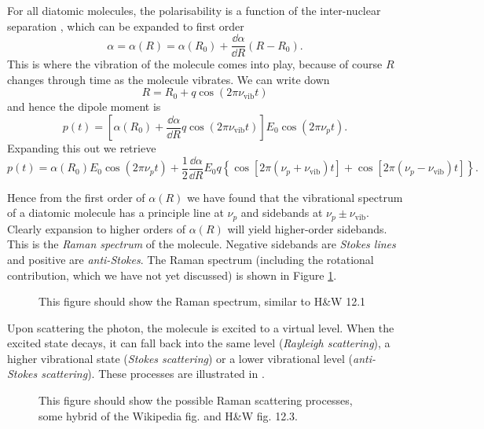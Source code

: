 For all diatomic molecules, the polarisability is a function of the
inter-nuclear separation \cite{}, which can be expanded to first order
%
\begin{equation}
\alpha = \alpha(R) = \alpha(R_0) + \frac{\dd \alpha}{\dd R}(R - R_0).
\end{equation}
%
This is where the vibration of the molecule comes into play, because of course
$R$ changes through time as the molecule vibrates. We can write down
%
\begin{equation}
R = R_0 + q \cos (2\pi \nu_\text{vib} t)
\end{equation}
and hence the dipole moment is
\begin{equation}
p(t) = \left[ \alpha(R_0) + \frac{\dd \alpha}{\dd R} q\cos (2\pi\nu_\text{vib}t)
\right] E_0 \cos(2\pi\nu_p t).
\end{equation}
Expanding this out we retrieve
\begin{equation}
p(t) = \alpha(R_0)E_0\cos(2\pi\nu_p t) + \frac{1}{2}\frac{\dd \alpha}{\dd R}
E_0 q \left\{ \cos\left[ 2\pi(\nu_p + \nu_\text{vib})t\right]
+ \cos\left[ 2\pi(\nu_p - \nu_\text{vib})t\right] \right\}.
\end{equation}

Hence from the first order of $\alpha(R)$ we have found that the vibrational
spectrum of a diatomic molecule has a principle line at $\nu_p$ and sidebands at
$\nu_p \pm \nu_\text{vib}$. Clearly expansion to higher orders of $\alpha(R)$
will yield higher-order sidebands. This is the \emph{Raman spectrum} of the
molecule. Negative sidebands are \emph{Stokes lines} and positive are
\emph{anti-Stokes}.
%
The Raman spectrum (including the rotational contribution, which we have not yet
discussed) is shown in Figure \ref{diaspec:fig:totalraman}.

\begin{figure}
  \caption{This figure should show the Raman spectrum, similar to H\&W 12.1}
  \label{diaspec:fig:totalraman}
\end{figure}

Upon scattering the photon, the molecule is excited to a virtual level. When the
excited state decays, it can fall back into the same level (\emph{Rayleigh
scattering}), a higher vibrational state (\emph{Stokes scattering}) or a lower
vibrational level (\emph{anti-Stokes scattering}). These processes are
illustrated in .

\begin{figure}
  \caption{This figure should show the possible Raman scattering processes, some
  hybrid of the Wikipedia fig. and H\&W fig. 12.3.}
  \label{diaspec:fig:ramanscatter}
\end{figure}

